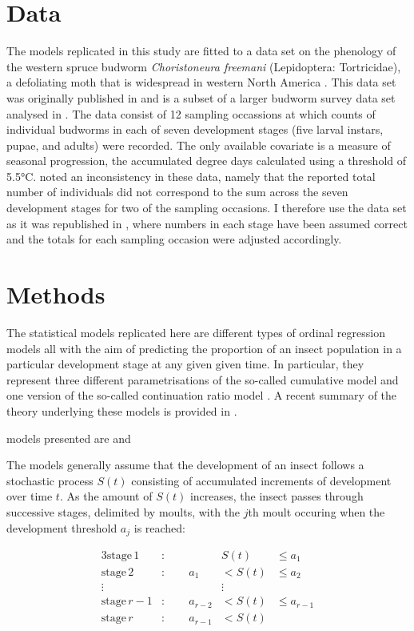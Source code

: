 \section{Data}
The models replicated in this study are fitted to a data set on the phenology of the western spruce budworm \emph{Choristoneura freemani} (Lepidoptera: Tortricidae), a defoliating moth that is widespread in western North America \citep{brookes1987western}. This data set was originally published in \citep{dennis1986stochastic} and is a subset of a larger budworm survey data set analysed in \citep{kemp1986}. The data consist of 12 sampling occassions at which counts of individual budworms in each of seven development stages (five larval instars, pupae, and adults) were recorded. The only available covariate is a measure of seasonal progression, the accumulated degree days calculated using a threshold of 5.5°C. \citet{candy1991modeling} noted an inconsistency in these data, namely that the reported total number of individuals did not correspond to the sum across the seven development stages for two of the sampling occasions. I therefore use the data set as it was republished in \citet{candy1990biology}, where numbers in each stage have been assumed correct and the totals for each sampling occasion were adjusted accordingly.

\section{Methods}
The statistical models replicated here are different types of ordinal regression models \citep{agresti} all with the aim of predicting the proportion of an insect population in a particular development stage at any given given time. In particular, they represent three different parametrisations of the so-called cumulative model and one version of the so-called continuation ratio model \citep{}. A recent summary of the theory underlying these models is provided in \citep{buerkner?}.


models presented are  \citet{dennis1986stochastic} and \citet{candy1991modeling} 

The models generally assume that the development of an insect follows a stochastic process $S(t)$ consisting of accumulated increments of development over time $t$. As the amount of $S(t)$ increases, the insect passes through successive stages, delimited by moults, with the $j$th moult occuring when the development threshold $a_j$ is reached:

\begin{alignat*}{3}
  \mathrm{stage}\,1&:\qquad {}&   S(t) & \leq a_1 \\
  \mathrm{stage}\,2&:\qquad  a_1&< S(t) & \leq a_2 \\
  \vdots & &\vdots \\
  \mathrm{stage}\,r-1&:\qquad  a_{r-2}&< S(t) & \leq a_{r-1} \\
  \mathrm{stage}\,r&:\qquad  a_{r-1}&< S(t) 
\end{alignat*}


